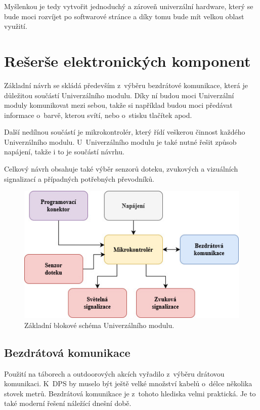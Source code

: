 Myšlenkou je tedy vytvořit jednoduchý a zároveň univerzální hardware, který se bude moci rozvíjet po softwarové stránce a díky tomu bude mít velkou 
oblast využití. 


\chapter{Rešerše elektronických komponent}
Základní návrh se skládá především z~výběru bezdrátové komunikace, která je důležitou součástí Univerzálního modulu. Díky ní budou moci Univerzální 
moduly komunikovat mezi sebou, takže si například budou moci předávat informace o~barvě, kterou svítí, nebo o~stisku tlačítek apod. 

Další nedílnou součástí je mikrokontrolér, který řídí veškerou činnost každého Univerzálního modulu. U~Univerzálního modulu je také nutné řešit způsob napájení,
takže i to je součástí návrhu.

Celkový návrh obsahuje také výběr senzorů doteku, zvukových a vizuálních signalizací a případných potřebných převodníků. 

\begin{figure}[!h]
  \begin{center}
    \includegraphics[scale=0.7]{obrazky/zakladni_blokove_schema.jpg}
  \end{center}
  \caption[Základní blokové schéma Univerzálního modulu]{Základní blokové schéma Univerzálního modulu.}
\end{figure}

\section{Bezdrátová komunikace}
Použití na táborech a outdoorových akcích vyřadilo z~výběru drátovou komunikaci. K~DPS by muselo být ještě velké množství kabelů 
o~délce několika stovek metrů. Bezdrátová komunikace je z~tohoto hlediska velmi praktická. Je to také moderní řešení 
náležící dnešní době. 

